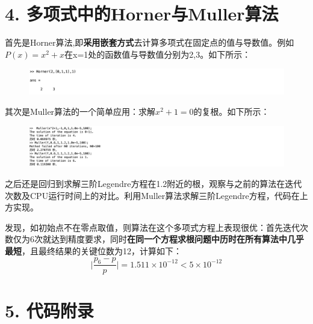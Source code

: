 \documentclass{article}
\begin{document}
\section{4. 多项式中的Horner与Muller算法}
    首先是Horner算法,即\textbf{采用嵌套方式}去计算多项式在固定点的值与导数值。例如$P(x)=x^2+x$在x=1处的函数值与导数值分别为2,3。如下所示：
    \begin{figure}[h]
    \centering
    \includegraphics[scale=0.5]{运行程序4.jpg}
    \end{figure}

    其次是Muller算法的一个简单应用：求解$x^2+1=0$的复根。如下所示：

    \begin{figure}[h]
    \centering
    \includegraphics[scale=0.5]{运行程序5.jpg}
    \end{figure}

    之后还是回归到求解三阶Legendre方程在1.2附近的根，观察与之前的算法在迭代次数及CPU运行时间上的对比。利用Muller算法求解三阶Legendre方程，代码在上方实现。

    发现，如初始点不在零点取值，则算法在这个多项式方程上表现很优：首先迭代次数仅为6次就达到精度要求，同时\textbf{在同一个方程求根问题中历时在所有算法中几乎最短}，且最终结果的关键位数为12，计算如下：
    $$\bigg|\frac{p_{6}-p}{p}\bigg|=1.511\times 10^{-12}<5\times 10^{-12}
    $$

\newpage

\section{5. 代码附录}
\end{document}
